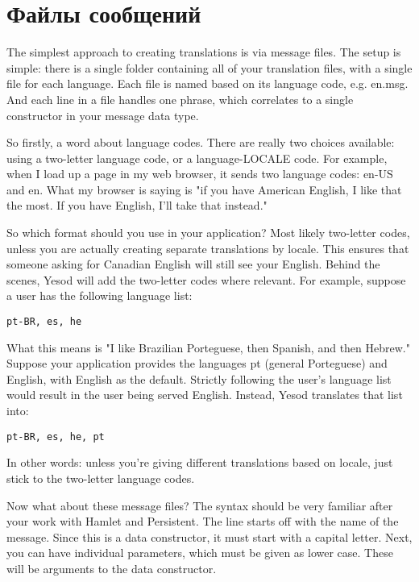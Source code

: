 \section{Файлы сообщений} %

The simplest approach to creating translations is via message files. The setup is simple: there is a single folder containing all of your translation files, with a single file for each language. Each file is named based on its language code, e.g. en.msg. And each line in a file handles one phrase, which correlates to a single constructor in your message data type.


So firstly, a word about language codes. There are really two choices available: using a two-letter language code, or a language-LOCALE code. For example, when I load up a page in my web browser, it sends two language codes: en-US and en. What my browser is saying is "if you have American English, I like that the most. If you have English, I'll take that instead."

So which format should you use in your application? Most likely two-letter codes, unless you are actually creating separate translations by locale. This ensures that someone asking for Canadian English will still see your English. Behind the scenes, Yesod will add the two-letter codes where relevant. For example, suppose a user has the following language list:

\begin{lstlisting}
pt-BR, es, he
\end{lstlisting}

What this means is "I like Brazilian Porteguese, then Spanish, and then Hebrew." Suppose your application provides the languages pt (general Porteguese) and English, with English as the default. Strictly following the user's language list would result in the user being served English. Instead, Yesod translates that list into:

\begin{lstlisting}
pt-BR, es, he, pt
\end{lstlisting}

In other words: unless you're giving different translations based on locale, just stick to the two-letter language codes.

Now what about these message files? The syntax should be very familiar after your work with Hamlet and Persistent. The line starts off with the name of the message. Since this is a data constructor, it must start with a capital letter. Next, you can have individual parameters, which must be given as lower case. These will be arguments to the data constructor.

